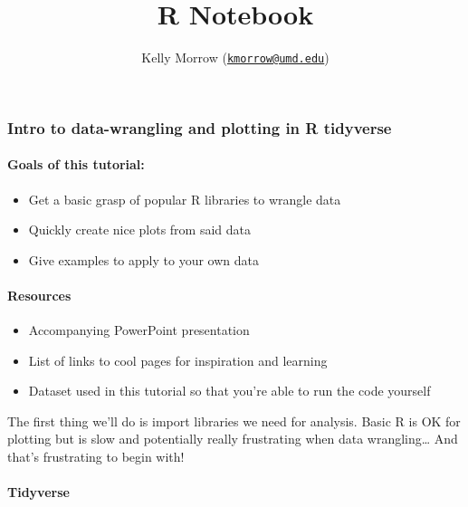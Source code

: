\documentclass[
]{article}
\title{R Notebook}
\author{Kelly Morrow
(\href{mailto:kmorrow@umd.edu}{\nolinkurl{kmorrow@umd.edu}})}
\date{}
\providecommand{\tightlist}{%
  \setlength{\itemsep}{0pt}\setlength{\parskip}{0pt}}
\begin{document}
\maketitle

\hypertarget{intro-to-data-wrangling-and-plotting-in-r-tidyverse}{%
\subsubsection{Intro to data-wrangling and plotting in R
tidyverse}\label{intro-to-data-wrangling-and-plotting-in-r-tidyverse}}

\hypertarget{goals-of-this-tutorial}{%
\paragraph{Goals of this tutorial:}\label{goals-of-this-tutorial}}

\begin{itemize}
\tightlist
\item
  Get a basic grasp of popular R libraries to wrangle data
\item
  Quickly create nice plots from said data
\item
  Give examples to apply to your own data
\end{itemize}

\hypertarget{resources}{%
\paragraph{Resources}\label{resources}}

\begin{itemize}
\item
  Accompanying PowerPoint presentation
\item
  List of links to cool pages for inspiration and learning
\item
  Dataset used in this tutorial so that you're able to run the code
  yourself
\end{itemize}

The first thing we'll do is import libraries we need for analysis. Basic
R is OK for plotting but is slow and potentially really frustrating when
data wrangling\ldots{} And that's frustrating to begin with!

\hypertarget{tidyverse}{%
\paragraph{Tidyverse}\label{tidyverse}}
\end{document}

